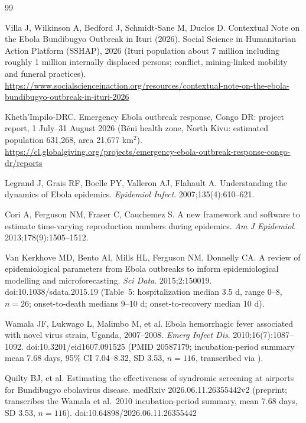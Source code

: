 \documentclass[10pt]{plos}
\begin{document}
\begin{thebibliography}{99}

 Villa J, Wilkinson A, Bedford J, Schmidt-Sane M,
Duclos D. Contextual Note on the Ebola Bundibugyo Outbreak in Ituri
(2026). Social Science in Humanitarian Action Platform (SSHAP), 2026
(Ituri population about 7 million including roughly 1 million internally
displaced persons; conflict, mining-linked mobility and funeral
practices).
\url{https://www.socialscienceinaction.org/resources/contextual-note-on-the-ebola-bundibugyo-outbreak-in-ituri-2026}

 Kheth'Impilo-DRC. Emergency Ebola outbreak
response, Congo DR: project report, 1 July--31 August 2026 (B\'eni health
zone, North Kivu: estimated population 631{,}268, area 21{,}677
km$^2$).
\url{https://cl.globalgiving.org/projects/emergency-ebola-outbreak-response-congo-dr/reports}

 Legrand J, Grais RF, Boelle PY, Valleron AJ,
Flahault A. Understanding the dynamics of Ebola epidemics. \emph{Epidemiol
Infect}. 2007;135(4):610--621.

 Cori A, Ferguson NM, Fraser C, Cauchemez S. A new
framework and software to estimate time-varying reproduction numbers
during epidemics. \emph{Am J Epidemiol}. 2013;178(9):1505--1512.

 Van Kerkhove MD, Bento AI, Mills HL, Ferguson
NM, Donnelly CA. A review of epidemiological parameters from Ebola
outbreaks to inform epidemiological modelling and microforecasting.
\emph{Sci Data}. 2015;2:150019. doi:10.1038/sdata.2015.19 (Table~5:
hospitalization median 3.5 d, range 0--8, $n=26$; onset-to-death medians
9--10 d; onset-to-recovery median 10 d).

 Wamala JF, Lukwago L, Malimbo M, et al. Ebola
hemorrhagic fever associated with novel virus strain, Uganda,
2007--2008. \emph{Emerg Infect Dis}. 2010;16(7):1087--1092.
doi:10.3201/eid1607.091525 (PMID 20587179; incubation-period summary
mean 7.68 days, 95\% CI 7.04--8.32, SD 3.53, $n=116$, transcribed via
\cite{Quilty2026}).

 Quilty BJ, et al. Estimating the effectiveness of
syndromic screening at airports for Bundibugyo ebolavirus disease.
medRxiv 2026.06.11.26355442v2 (preprint; transcribes the Wamala et al.\
2010 incubation-period summary, mean 7.68 days, SD 3.53, $n=116$).
doi:10.64898/2026.06.11.26355442


\end{thebibliography}
\end{document}
